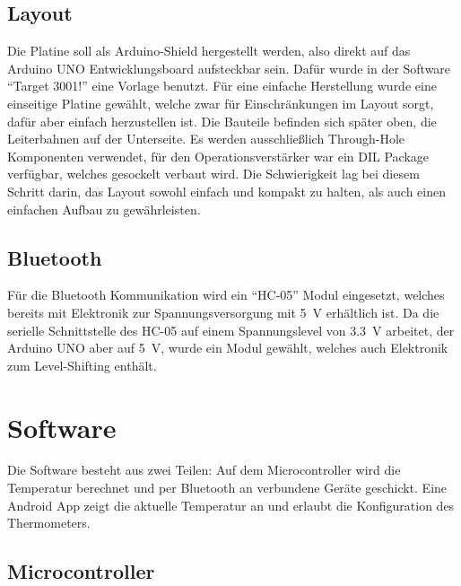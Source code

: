 \documentclass{article}
\begin{document}
\subsection{Layout}

Die Platine soll als Arduino-Shield hergestellt werden, also direkt auf das Arduino
UNO Entwicklungsboard aufsteckbar sein. Dafür wurde in der Software \enquote{Target 3001!}
eine Vorlage\cite{arduinoTarget} benutzt. Für eine einfache Herstellung wurde
eine einseitige Platine gewählt, welche zwar für Einschränkungen im Layout
sorgt, dafür aber einfach herzustellen ist. Die Bauteile befinden sich später
oben, die Leiterbahnen auf der Unterseite. Es werden ausschließlich
Through-Hole Komponenten verwendet, für den Operationsverstärker war ein DIL
Package verfügbar, welches gesockelt verbaut wird. Die Schwierigkeit lag bei
diesem Schritt darin, das Layout sowohl einfach und kompakt zu halten, als auch
einen einfachen Aufbau zu gewährleisten.

\subsection{Bluetooth}

Für die Bluetooth Kommunikation wird ein \enquote{HC-05} Modul eingesetzt,
welches bereits mit Elektronik zur Spannungsversorgung mit \SI{5}{\volt}
erhältlich ist. Da die serielle Schnittstelle des HC-05 auf einem Spannungslevel
von \SI{3.3}{\volt} arbeitet, der Arduino UNO aber auf \SI{5}{\volt}, wurde
ein Modul gewählt, welches auch Elektronik zum Level-Shifting enthält.


\section{Software}

Die Software besteht aus zwei Teilen: Auf dem Microcontroller wird die
Temperatur berechnet und per Bluetooth an verbundene Geräte geschickt. Eine
Android App zeigt die aktuelle Temperatur an und erlaubt die Konfiguration des
Thermometers.

\subsection{Microcontroller}
\end{document}
